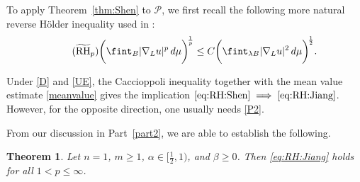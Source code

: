 \documentclass[12pt]{amsart}
\newtheorem{theorem}{Theorem}[section]
\begin{document}
To apply Theorem~\ref{thm:Shen} to $\mathcal{P}$, we first recall the following more natural reverse H\"older inequality used in \cite{Shen}:
\begin{equation}\label{eq:RH:Shen}\tag{$\widetilde{\mathrm{RH}}_p$}
     \biggl( \fint_B |\nabla_L u|^p \, d\mu \biggr)^{\!\frac{1}{p}} \le C \biggl( \fint_{\lambda B} |\nabla_L u|^2 \, d\mu \biggr)^{\!\frac{1}{2}}.
\end{equation}

Under \eqref{D} and \eqref{UE}, the Caccioppoli inequality together with the mean value estimate \eqref{meanvalue} gives the implication $\eqref{eq:RH:Shen} \implies \eqref{eq:RH:Jiang}$. However, for the opposite direction, one usually needs \eqref{P2}. 

From our discussion in Part~\ref{part2}, we are able to establish the following.

\begin{theorem}\label{thm:RH:n1:alpha>1/2}
Let $n=1$, $m\ge1$, $\alpha \in [\frac{1}{2},1)$, and $\beta \ge0$. Then \eqref{eq:RH:Jiang} holds for all $1<p\le \infty$.
\end{theorem}
\end{document}
